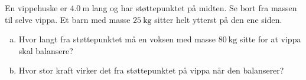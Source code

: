 %
En vippehuske er $\SI{4.0}{\metre}$ lang og har støttepunktet på midten. Se bort fra massen til selve vippa. Et barn med masse $\SI{25}{\kilo\gram}$ sitter helt ytterst på den ene siden.
\begin{enumerate}[a)]
    \item Hvor langt fra støttepunktet må en voksen med masse $\SI{80}{\kilo\gram}$ sitte for at vippa skal balansere?
    \item Hvor stor kraft virker det fra støttepunktet på vippa når den balanserer?
\end{enumerate}
